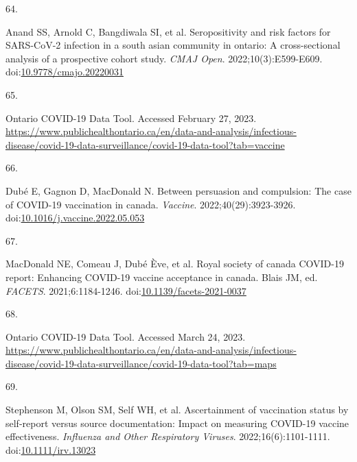 \documentclass[
  letterpaper,
  DIV=11,
  numbers=noendperiod]{scrartcl}
\newlength{\cslhangindent}
\newlength{\csllabelwidth}
\newlength{\cslentryspacingunit} %
\newenvironment{CSLReferences}[2] %
 {%
  \setlength{\parindent}{0pt}
  \ifodd #1
  \let\oldpar\par
  \def\par{\hangindent=\cslhangindent\oldpar}
  \fi
  \setlength{\parskip}{#2\cslentryspacingunit}
 }%
 {}
\newcommand{\CSLLeftMargin}[1]{\parbox[t]{\csllabelwidth}{#1}}
\newcommand{\CSLRightInline}[1]{\parbox[t]{\linewidth - \csllabelwidth}{#1}\break}
\begin{document}
\begin{CSLReferences}{0}{0}
\leavevmode{}%
\CSLLeftMargin{64. }%
\CSLRightInline{Anand SS, Arnold C, Bangdiwala SI, et al. Seropositivity
and risk factors for {SARS}-{CoV}-2 infection in a south asian community
in ontario: A cross-sectional analysis of a prospective cohort study.
\emph{{CMAJ} Open}. 2022;10(3):E599-E609.
doi:\href{https://doi.org/10.9778/cmajo.20220031}{10.9778/cmajo.20220031}}

\leavevmode{}%
\CSLLeftMargin{65. }%
\CSLRightInline{{Ontario COVID-19 Data Tool}. Accessed February 27,
2023.
\url{https://www.publichealthontario.ca/en/data-and-analysis/infectious-disease/covid-19-data-surveillance/covid-19-data-tool?tab=vaccine}}

\leavevmode{}%
\CSLLeftMargin{66. }%
\CSLRightInline{Dubé E, Gagnon D, MacDonald N. Between persuasion and
compulsion: The case of {COVID}-19 vaccination in canada.
\emph{Vaccine}. 2022;40(29):3923-3926.
doi:\href{https://doi.org/10.1016/j.vaccine.2022.05.053}{10.1016/j.vaccine.2022.05.053}}

\leavevmode{}%
\CSLLeftMargin{67. }%
\CSLRightInline{MacDonald NE, Comeau J, Dubé Ève, et al. Royal society
of canada {COVID}-19 report: Enhancing {COVID}-19 vaccine acceptance in
canada. Blais JM, ed. \emph{{FACETS}}. 2021;6:1184-1246.
doi:\href{https://doi.org/10.1139/facets-2021-0037}{10.1139/facets-2021-0037}}

\leavevmode{}%
\CSLLeftMargin{68. }%
\CSLRightInline{{Ontario COVID-19 Data Tool}. Accessed March 24, 2023.
\url{https://www.publichealthontario.ca/en/data-and-analysis/infectious-disease/covid-19-data-surveillance/covid-19-data-tool?tab=maps}}

\leavevmode{}%
\CSLLeftMargin{69. }%
\CSLRightInline{Stephenson M, Olson SM, Self WH, et al. Ascertainment of
vaccination status by self-report versus source documentation: Impact on
measuring {COVID}-19 vaccine effectiveness. \emph{Influenza and Other
Respiratory Viruses}. 2022;16(6):1101-1111.
doi:\href{https://doi.org/10.1111/irv.13023}{10.1111/irv.13023}}

\end{CSLReferences}
\end{document}

